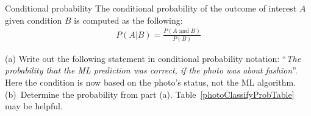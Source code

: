 \begin{onebox}{Conditional probability}
  The conditional probability of the outcome of interest $A$
  given condition $B$ is computed as the following:
  \begin{align*}
  P(A | B) = \frac{P(A\text{ and }B)}{P(B)}
  \end{align*}
\end{onebox}

\begin{exercisewrap}
\begin{nexercise}
\label{fashionProbOfMLNotGivenTruthNot}%
(a) Write out the following statement in conditional
probability notation:
``\emph{The probability that the ML prediction was correct,
if the photo was about fashion}''.
Here the condition is now based on the photo's
 status, not the ML algorithm. \\[1mm]
(b)~Determine the probability from part (a).
Table~\vref{photoClassifyProbTable} may be helpful.\footnotemark
\end{nexercise}
\end{exercisewrap}

